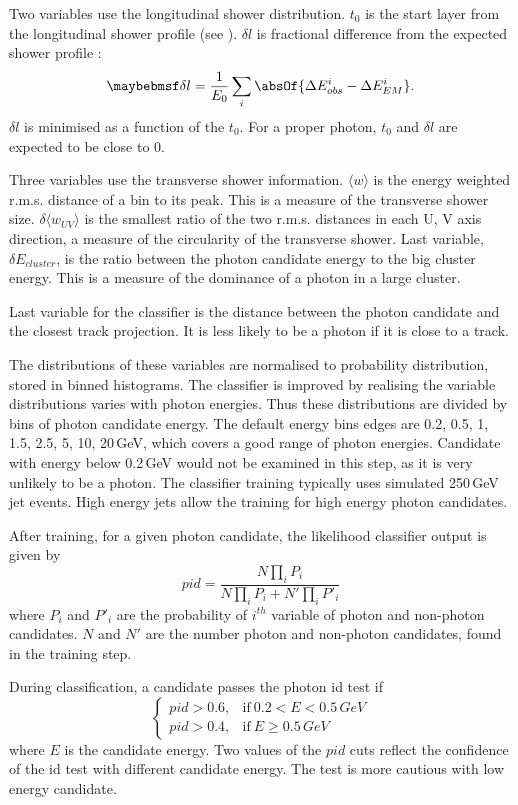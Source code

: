 Two variables use the longitudinal shower distribution. $t_0$ is the start layer from the longitudinal shower profile (see ). $\delta{l}$ is fractional difference from the expected shower profile \cite{Thomson:2009rp}:
\begin{equation}
\delta l = \frac{1}{E_0}\sum_{i}^{}\absOf{\Delta E_{obs}^i - \Delta E_{EM}^i }.
\end{equation}
$\delta l$ is minimised as a function of the $t_0$. For a proper photon, $t_0$  and $\delta l $ are expected to be close to 0.

Three variables use the transverse shower information. $\langle{w}\rangle$ is the energy weighted r.m.s. distance of a bin to its peak. This is a measure of the transverse shower size. $\delta{\langle{w_{UV}}\rangle}$ is the smallest ratio of the two r.m.s. distances in each U, V axis direction, a measure of the circularity of the transverse shower. Last variable, $\delta E_{cluster}$, is the  ratio between the photon candidate energy to the big cluster energy. This is a measure of the dominance of a photon in a large cluster. 

Last variable for the classifier is the distance between the photon candidate and the closest track projection. It is less likely to be a photon if it is close to a track.

The distributions of these variables are normalised to probability distribution, stored in binned histograms. The classifier is improved by realising the variable distributions varies with photon energies. Thus these distributions are divided by bins of photon candidate energy. The default energy bins edges are 0.2, 0.5, 1, 1.5, 2.5, 5, 10, 20\,GeV, which covers a good range of photon energies. Candidate with energy below 0.2\,GeV would not be examined in this step, as it is very unlikely to be a photon. The classifier training typically uses simulated 250\,GeV jet events. High energy jets allow the training for high energy photon candidates.

After training, for a given photon candidate, the likelihood classifier output is given by
\begin{equation}
pid = \frac{N\prod_{i}{P_i}}{N\prod_{i}{P_i} + N'\prod_{i}{P'_i}}
\end{equation}
where $P_i$ and $P'_i$ are the probability of $i^{th}$ variable of photon and non-photon candidates. $N$ and $N'$ are the number photon and non-photon candidates, found in the training step.

During classification, a candidate passes the photon id test if
\begin{equation}
\begin{cases}
  pid > 0.6, & \text{if}\ 0.2 < E < 0.5\,GeV\\
  pid > 0.4, & \text{if}\ E \geqslant 0.5\,GeV
\end{cases}
\end{equation}
where $E$ is the candidate energy. Two values of the $pid$ cuts reflect the confidence of the id test with different candidate energy. The test is more cautious with low energy candidate.


